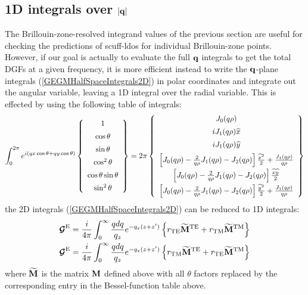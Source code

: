 \documentclass[letterpaper]{article}
\begin{document}
\subsection{1D integrals over $|\mathbf{q}|$}

The Brillouin-zone-resolved integrand values of the 
previous section are useful for checking the 
predictions of {\sc scuff-ldos} for individual 
Brillouin-zone points. However, if our goal is actually
to evaluate the full $\mathbf{q}$ integrals to get the
total DGFs at a given frequency, it is more efficient
instead to write the $\mathbf{q}$-plane integrals
(\ref{GEGMHalfSpaceIntegrals2D})
in polar coordinates and integrate out the angular
variable, leaving a 1D integral over the radial variable.
This is effected by using the following table of integrals:
$$
 \int_0^{2\pi} e^{i(qx\cos\theta  + qy\cos\theta)} 
 \left\{\begin{array}{c}
 1 \\[5pt]
 \cos\theta \\[5pt]
 \sin\theta \\[5pt]
 \cos^2\theta \\[5pt]
 \cos\theta \sin\theta \\[5pt]
 \sin^2\theta \\
 \end{array}\right\}
= 2\pi \left\{ \begin{array}{c}
    J_0 (q\rho)         \\[5pt]
    i J_1(q\rho) \widehat{x} \\[5pt]
    i J_1(q\rho) \widehat{y} \\[5pt]
    \left[J_0(q\rho) - \frac{2}{q\rho} J_1(q\rho) - J_2(q\rho)\right]\frac{\widehat{x}^2}{2} 
    + \frac{J_1(q\rho)}{q\rho} \\[5pt]
    \left[J_0(q\rho) - \frac{2}{q\rho} J_1(q\rho) - J_2(q\rho)\right]\frac{\widehat{x} \widehat{y}}{2}
    \\[5pt]
    \left[J_0(q\rho) - \frac{2}{q\rho} J_1(q\rho) - J_2(q\rho)\right]\frac{\widehat{y}^2}{2} 
    + \frac{J_1(q\rho)}{q\rho}
  \end{array}\right\}
$$
the 2D integrals (\ref{GEGMHalfSpaceIntegrals2D}) can be reduced to 1D integrals:
\begin{align}
 \boldsymbol{\mathcal{G}}^{\text{\scriptsize E}}
&=\frac{i}{4\pi} \int_0^\infty \frac{qdq}{q_z} e^{-q_z(z+z^\prime)}
  \left\{ r_{\text{\scriptsize TE}} \widetilde{\mathbf{M}}^{\text{\scriptsize TE}}
         +r_{\text{\scriptsize TM}} \widetilde{\mathbf{M}}^{\text{\scriptsize TM}}
  \right\}
\\
 \boldsymbol{\mathcal{G}}^{\text{\scriptsize E}}
&=\frac{i}{4\pi} \int_0^\infty \frac{qdq}{q_z} e^{-q_z(z+z^\prime)}
  \left\{ r_{\text{\scriptsize TM}} \widetilde{\mathbf{M}}^{\text{\scriptsize TE}}
         +r_{\text{\scriptsize TE}} \widetilde{\mathbf{M}}^{\text{\scriptsize TM}}
  \right\}
\end{align}
where $\widetilde{\mathbf{M}}$ is the matrix $\mathbf{M}$ defined above
with all $\theta$ factors replaced by the corresponding
entry in the Bessel-function table above.
\end{document}
